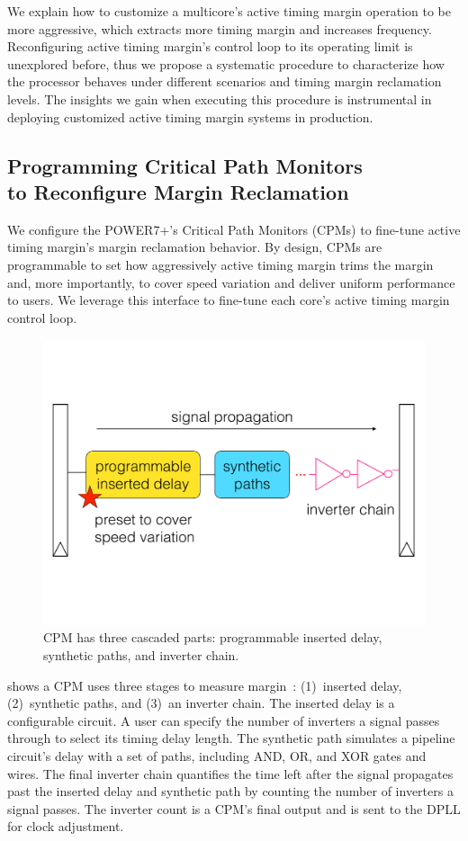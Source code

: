 We explain how to customize a multicore's active timing margin operation to be more aggressive, which extracts more timing margin and increases frequency. Reconfiguring active timing margin's control loop to its operating limit is unexplored before, thus we propose a systematic procedure to characterize how the processor behaves under different scenarios and timing margin reclamation levels. The insights we gain when executing this procedure is instrumental in deploying customized active timing margin systems in production.

\subsection{Programming Critical Path Monitors \\to Reconfigure Margin Reclamation}
\label{sec:process:configurability:howto}

We configure the POWER7+'s Critical Path Monitors (CPMs) to fine-tune active timing margin's margin reclamation behavior. By design, CPMs are programmable to set how aggressively active timing margin trims the margin and, more importantly, to cover speed variation and deliver uniform performance to users. We leverage this interface to fine-tune each core's active timing margin control loop.

\begin{figure}[t]
  \centering
  \includegraphics[trim=0 130 0 130,clip,width=0.8\linewidth]{graphs/process/cpm-struct.pdf}
  \captionsetup{width=.95\linewidth}
  \caption{CPM has three cascaded parts: programmable inserted delay, synthetic paths, and inverter chain.}
  \label{fig:cpm-struct}
\end{figure}

 shows a CPM uses three stages to measure margin~\cite{drake2007distributed, drake2013single}: (1)~inserted delay, (2)~synthetic paths, and (3)~an inverter chain. The inserted delay is a configurable circuit. A user can specify the number of inverters a signal passes through to select its timing delay length. The synthetic path simulates a pipeline circuit's delay with a set of paths, including AND, OR, and XOR gates and wires. The final inverter chain quantifies the time left after the signal propagates past the inserted delay and synthetic path by counting the number of inverters a signal passes. The inverter count is a CPM's final output and is sent to the DPLL for clock adjustment.


